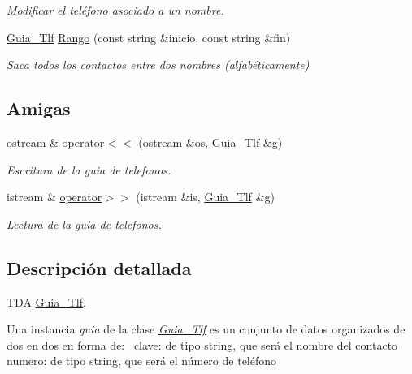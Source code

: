 \begin{DoxyCompactItemize}
\begin{DoxyCompactList}\small\item\em Modificar el teléfono asociado a un nombre. \end{DoxyCompactList}\item 
\hyperlink{classGuia__Tlf}{Guia\+\_\+\+Tlf} \hyperlink{classGuia__Tlf_a9d954f8383fca465ea79e4b78779c53f}{Rango} (const string \&inicio, const string \&fin)
\begin{DoxyCompactList}\small\item\em Saca todos los contactos entre dos nombres (alfabéticamente) \end{DoxyCompactList}\end{DoxyCompactItemize}
\subsection*{Amigas}
\begin{DoxyCompactItemize}
\item 
ostream \& \hyperlink{classGuia__Tlf_a73eb02557f3118999710c66aa9ecf309}{operator$<$$<$} (ostream \&os, \hyperlink{classGuia__Tlf}{Guia\+\_\+\+Tlf} \&g)
\begin{DoxyCompactList}\small\item\em Escritura de la guia de telefonos. \end{DoxyCompactList}\item 
istream \& \hyperlink{classGuia__Tlf_ac15a5b0c2eb7d5b1843f11beb492495e}{operator$>$$>$} (istream \&is, \hyperlink{classGuia__Tlf}{Guia\+\_\+\+Tlf} \&g)
\begin{DoxyCompactList}\small\item\em Lectura de la guia de telefonos. \end{DoxyCompactList}\end{DoxyCompactItemize}


\subsection{Descripción detallada}
T\+DA \hyperlink{classGuia__Tlf}{Guia\+\_\+\+Tlf}. 

Una instancia {\itshape guia} de la clase {\itshape \hyperlink{classGuia__Tlf}{Guia\+\_\+\+Tlf}} es un conjunto de datos organizados de dos en dos en forma de\+:~\newline
clave\+: de tipo string, que será el nombre del contacto~\newline
numero\+: de tipo string, que será el número de teléfono~\newline


